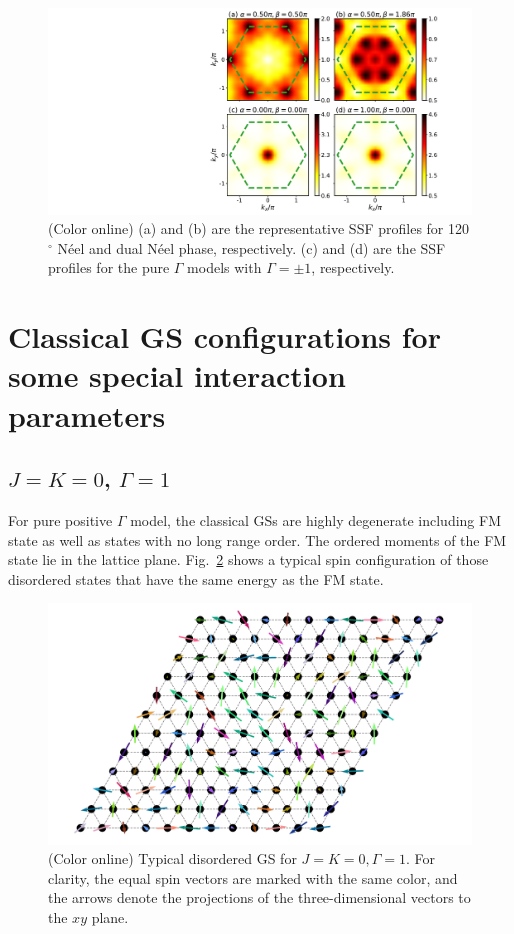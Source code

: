 \documentclass[aps,prb,reprint,amsfonts,amsmath,amssymb,showpacs,groupedaddress,superscriptaddress]{revtex4-1}
\begin{document}
\begin{figure}
    \centering
    \includegraphics[width=\columnwidth]{AppendixSSF.pdf}
    \caption{\label{fig:AppendixSSF}(Color online) (a) and (b) are the representative SSF profiles for 120$^\circ$ N\'{e}el and dual N\'{e}el phase, respectively. (c) and (d) are the SSF profiles for the pure $\Gamma$ models with $\Gamma = \pm 1$, respectively.}
\end{figure}

\section{\label{apx:DegeneratedStates}Classical GS configurations for some special interaction parameters}

\subsection{$J=K=0$, $\Gamma=1$}

For pure positive $\Gamma$ model, the classical GSs are highly degenerate including FM state as well as states with no long range order. The ordered moments of the FM state lie in the lattice plane. Fig.~\ref{fig:GSForPositiveGamma} shows a typical spin configuration of those disordered states that have the same energy as the FM state.

\begin{figure}
    \centering
    \includegraphics[width=\columnwidth]{SpinConfigForPositiveGamma.pdf}
    \caption{\label{fig:GSForPositiveGamma}(Color online) Typical disordered GS for $J=K=0, \Gamma=1$. For clarity, the equal spin vectors are marked with the same color, and the arrows denote the projections of the three-dimensional vectors to the $xy$ plane.}
\end{figure}
\end{document}
